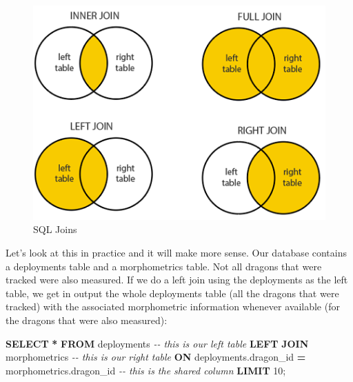 \documentclass[
]{book}
\newenvironment{Shaded}{\begin{snugshade}}{\end{snugshade}}
\newcommand{\CommentTok}[1]{\textcolor[rgb]{0.56,0.35,0.01}{\textit{#1}}}
\newcommand{\DecValTok}[1]{\textcolor[rgb]{0.00,0.00,0.81}{#1}}
\newcommand{\KeywordTok}[1]{\textcolor[rgb]{0.13,0.29,0.53}{\textbf{#1}}}
\newcommand{\NormalTok}[1]{#1}
\newcommand{\OperatorTok}[1]{\textcolor[rgb]{0.81,0.36,0.00}{\textbf{#1}}}
\begin{document}
\begin{figure}

{\centering \includegraphics[width=0.6\linewidth]{img/sql-joins} 

}

\caption{SQL Joins}\label{fig:sql-joins}
\end{figure}

Let's look at this in practice and it will make more sense. Our database
contains a deployments table and a morphometrics table. Not all dragons that
were tracked were also measured. If we do a left join using the deployments as
the left table, we get in output the whole deployments table (all the dragons
that were tracked) with the associated morphometric information whenever
available (for the dragons that were also measured):

\begin{Shaded}
\begin{Highlighting}[]
\KeywordTok{SELECT} \OperatorTok{*}
\KeywordTok{FROM}\NormalTok{ deployments }\CommentTok{{-}{-} this is our left table}
\KeywordTok{LEFT} \KeywordTok{JOIN}\NormalTok{ morphometrics }\CommentTok{{-}{-} this is our right table }
\KeywordTok{ON}\NormalTok{ deployments.dragon\_id }\OperatorTok{=}\NormalTok{ morphometrics.dragon\_id }\CommentTok{{-}{-} this is the shared column}
\KeywordTok{LIMIT} \DecValTok{10}\NormalTok{;}
\end{Highlighting}
\end{Shaded}
\end{document}
